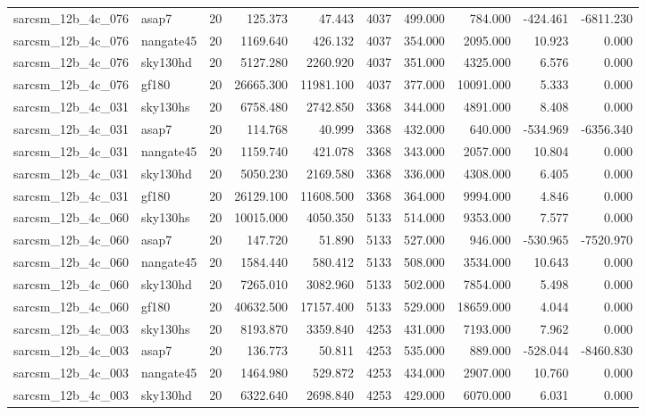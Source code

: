 \begin{longtable}{llrrrrrrrr}
sarcsm\_12b\_4c\_076 & asap7 & 20 & 125.373 & 47.443 & 4037 & 499.000 & 784.000 & -424.461 & -6811.230 \\
sarcsm\_12b\_4c\_076 & nangate45 & 20 & 1169.640 & 426.132 & 4037 & 354.000 & 2095.000 & 10.923 & 0.000 \\
sarcsm\_12b\_4c\_076 & sky130hd & 20 & 5127.280 & 2260.920 & 4037 & 351.000 & 4325.000 & 6.576 & 0.000 \\
sarcsm\_12b\_4c\_076 & gf180 & 20 & 26665.300 & 11981.100 & 4037 & 377.000 & 10091.000 & 5.333 & 0.000 \\
sarcsm\_12b\_4c\_031 & sky130hs & 20 & 6758.480 & 2742.850 & 3368 & 344.000 & 4891.000 & 8.408 & 0.000 \\
sarcsm\_12b\_4c\_031 & asap7 & 20 & 114.768 & 40.999 & 3368 & 432.000 & 640.000 & -534.969 & -6356.340 \\
sarcsm\_12b\_4c\_031 & nangate45 & 20 & 1159.740 & 421.078 & 3368 & 343.000 & 2057.000 & 10.804 & 0.000 \\
sarcsm\_12b\_4c\_031 & sky130hd & 20 & 5050.230 & 2169.580 & 3368 & 336.000 & 4308.000 & 6.405 & 0.000 \\
sarcsm\_12b\_4c\_031 & gf180 & 20 & 26129.100 & 11608.500 & 3368 & 364.000 & 9994.000 & 4.846 & 0.000 \\
sarcsm\_12b\_4c\_060 & sky130hs & 20 & 10015.000 & 4050.350 & 5133 & 514.000 & 9353.000 & 7.577 & 0.000 \\
sarcsm\_12b\_4c\_060 & asap7 & 20 & 147.720 & 51.890 & 5133 & 527.000 & 946.000 & -530.965 & -7520.970 \\
sarcsm\_12b\_4c\_060 & nangate45 & 20 & 1584.440 & 580.412 & 5133 & 508.000 & 3534.000 & 10.643 & 0.000 \\
sarcsm\_12b\_4c\_060 & sky130hd & 20 & 7265.010 & 3082.960 & 5133 & 502.000 & 7854.000 & 5.498 & 0.000 \\
sarcsm\_12b\_4c\_060 & gf180 & 20 & 40632.500 & 17157.400 & 5133 & 529.000 & 18659.000 & 4.044 & 0.000 \\
sarcsm\_12b\_4c\_003 & sky130hs & 20 & 8193.870 & 3359.840 & 4253 & 431.000 & 7193.000 & 7.962 & 0.000 \\
sarcsm\_12b\_4c\_003 & asap7 & 20 & 136.773 & 50.811 & 4253 & 535.000 & 889.000 & -528.044 & -8460.830 \\
sarcsm\_12b\_4c\_003 & nangate45 & 20 & 1464.980 & 529.872 & 4253 & 434.000 & 2907.000 & 10.760 & 0.000 \\
sarcsm\_12b\_4c\_003 & sky130hd & 20 & 6322.640 & 2698.840 & 4253 & 429.000 & 6070.000 & 6.031 & 0.000 \\

\end{longtable}
